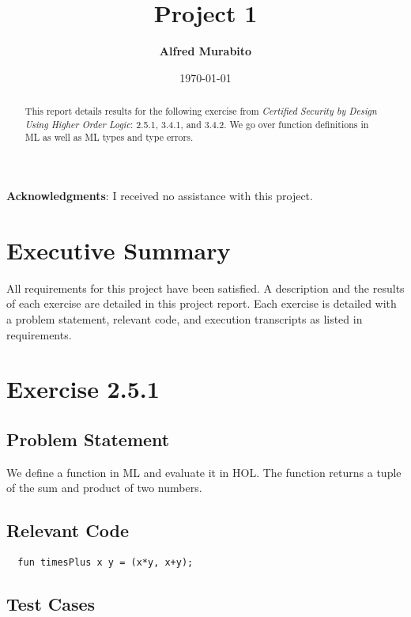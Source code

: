 \documentclass[letterpaper]{report}
\title{Project 1}
\author{\textbf{Alfred Murabito}}
\date{\today}
\begin{document}
\maketitle{}

\begin{abstract}
\noindent{}This report details results for the following exercise from \textit{Certified Security by Design Using Higher Order Logic}: 2.5.1, 3.4.1, and 3.4.2. We go over function definitions in  ML 
as well as ML types and type errors.
\end{abstract}

\newpage

\textbf{Acknowledgments}: I received no assistance with this project.

\newpage

\tableofcontents

\newpage

\chapter{Executive Summary}
\label{sec:executive-summary}

All requirements for this project have been satisfied.  A description and the results of each exercise are detailed in this project report. Each exercise is detailed with a problem statement, relevant
code, and execution transcripts as listed in requirements.

\newpage

\chapter{Exercise 2.5.1}
\label{cha:exercise-2.5.1}

\section{Problem Statement}
We define a function in ML and evaluate it in HOL. The function
returns a tuple of the sum and product of two numbers.

\section{Relevant Code}

\begin{lstlisting}
  fun timesPlus x y = (x*y, x+y);
\end{lstlisting}

\section{Test Cases}
\end{document}
